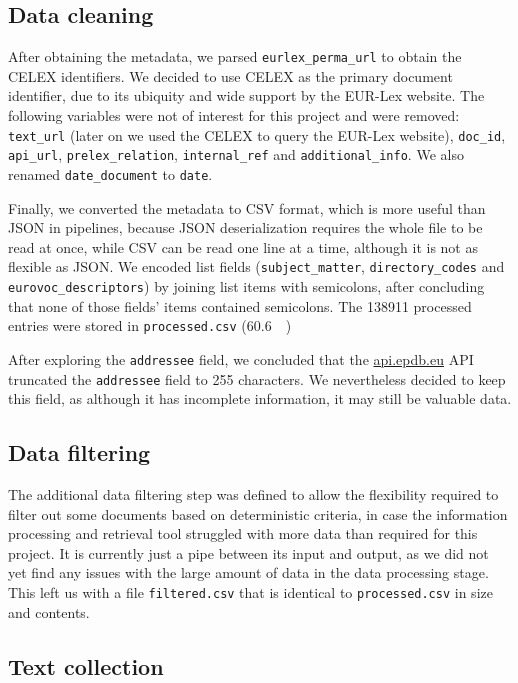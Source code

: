 \documentclass[sigconf, authorversion]{acmart}
\begin{document}
\subsection{Data cleaning}
\label{ssec:data-cleaning}

After obtaining the metadata, we parsed \texttt{eurlex\_perma\_url} to obtain the CELEX identifiers. We decided to use CELEX as the primary document identifier, due to its ubiquity and wide support by the EUR-Lex website.
The following variables were not of interest for this project and were removed: \texttt{text\_url} (later on we used the CELEX to query the EUR-Lex website), \texttt{doc\_id}, \texttt{api\_url}, \texttt{prelex\_relation}, \texttt{internal\_ref} and \texttt{additional\_info}. We also renamed \texttt{date\_document} to \texttt{date}.

Finally, we converted the metadata to CSV format, which is more useful than JSON in pipelines, because JSON deserialization requires the whole file to be read at once, while CSV can be read one line at a time, although it is not as flexible as JSON. We encoded list fields (\texttt{subject\_matter}, \texttt{directory\_codes} and \texttt{eurovoc\_descriptors}) by joining list items with semicolons, after concluding that none of those fields' items contained semicolons.
The \SI{138911}{} processed entries were stored in \texttt{processed.csv} (\SI{60.6}{\mega\byte})

After exploring the \texttt{addressee} field, we concluded that the \url{api.epdb.eu} API truncated the \texttt{addressee} field to 255 characters. We nevertheless decided to keep this field, as although it has incomplete information, it may still be valuable data.

\subsection{Data filtering}

The additional data filtering step was defined to allow the flexibility required to filter out some documents based on deterministic criteria, in case the information processing and retrieval tool struggled with more data than required for this project. It is currently just a pipe between its input and output, as we did not yet find any issues with the large amount of data in the data processing stage. This left us with a file \texttt{filtered.csv} that is identical to \texttt{processed.csv} in size and contents.

\subsection{Text collection}
\end{document}

